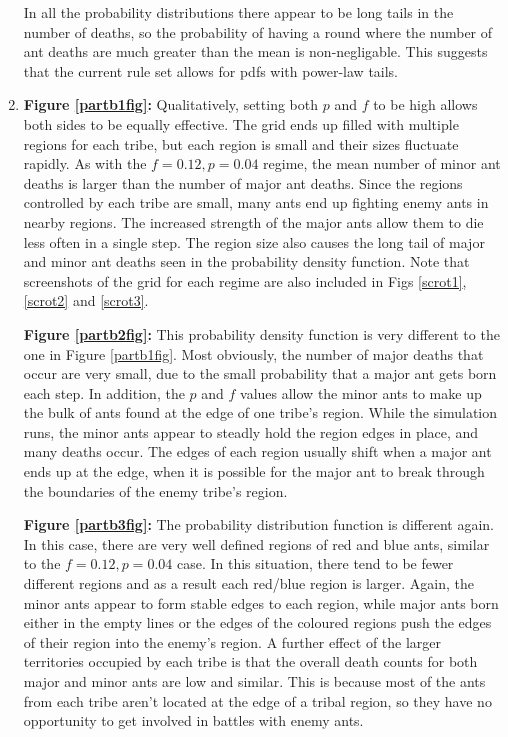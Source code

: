 \begin{enumerate}
In all the probability distributions there appear to be long tails in the 
number of deaths, so the probability of having a round where the
number of ant deaths are much greater than the mean is non-negligable.  This 
suggests that the current rule set allows for pdfs with power-law tails.

\item \textbf{Figure \ref{partb1fig}:} Qualitatively, setting both $p$ and $f$ to
be high allows both sides to be equally effective. The grid ends up filled 
with multiple regions for each tribe, but each region is small and their sizes
fluctuate rapidly. As with the $f = 0.12, 
p = 0.04$ regime, the mean number of minor ant deaths is larger than the number 
of major ant deaths. Since the regions controlled by each tribe are small, many 
ants end up fighting enemy ants in nearby regions. The increased strength of 
the major ants allow them to die less often in a single step. The region size
also causes the long tail of major and minor ant deaths seen in the probability
density function. Note that screenshots of the grid for each regime are also 
included in Figs \ref{scrot1}, \ref{scrot2} and \ref{scrot3}.

\textbf{Figure \ref{partb2fig}:} This probability density function is very
different to the one in Figure \ref{partb1fig}.  Most obviously, the number 
of major deaths that occur are very small, due to the small probability that
a major ant gets born each step.  In addition, the $p$ and $f$ values allow the
minor ants to make up the bulk of ants found at the edge of one tribe's region.
While the simulation runs, the minor ants appear to steadly hold the 
region edges in place, and many deaths occur.  The edges of each region usually
shift when a major ant ends up at the edge, when it is possible for the major ant to 
break through the boundaries of the enemy tribe's region.

\textbf{Figure \ref{partb3fig}:} The probability distribution function is
different again.  In this case, there are very well defined 
regions of red and blue ants, similar to the $f = 0.12, p = 0.04$ case.  In this 
situation, there tend to be fewer different regions and as a result each 
red/blue region is larger.  Again, the minor ants appear to form stable edges 
to each region, while major ants born either in the empty lines or the edges of 
the coloured regions push the edges of their region into the enemy's region.  A further 
effect of the larger territories occupied by each tribe is that the overall 
death counts for both major and minor ants are low and similar.  This is 
because most of the ants from each tribe aren't located at the edge of a tribal 
region, so they have no opportunity to get involved in battles with enemy ants.


\end{enumerate}
